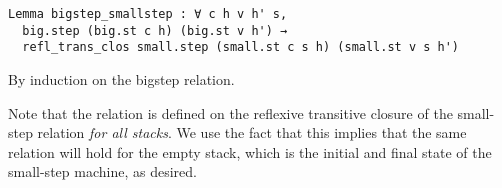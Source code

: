 \begin{lstlisting}
Lemma bigstep_smallstep : ∀ c h v h' s, 
  big.step (big.st c h) (big.st v h') → 
  refl_trans_clos small.step (small.st c s h) (small.st v s h')
\end{lstlisting}

\begin{proofoutline}
By induction on the bigstep relation.
\end{proofoutline}

Note that the relation is defined on the reflexive transitive closure of the
small-step relation \emph{for all stacks}. We use the fact that this implies
that the same relation will hold for the empty stack, which is the initial and
final state of the small-step machine, as desired.

